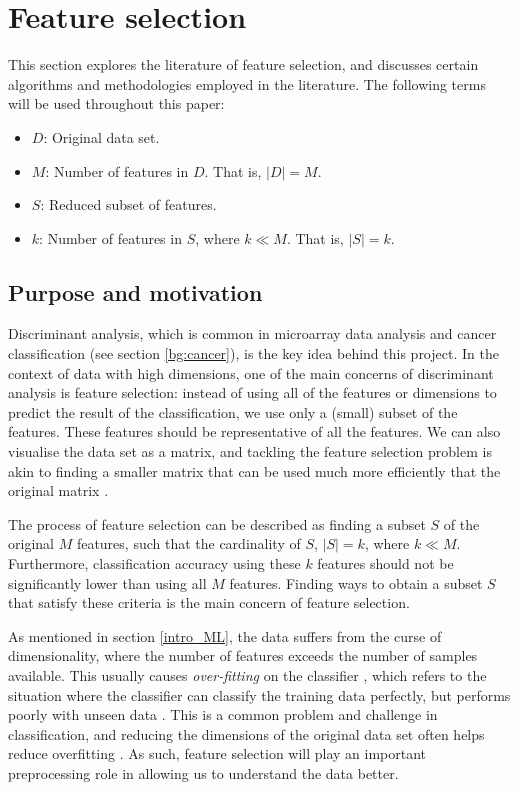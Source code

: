 \documentclass[12pt, twoside, a4paper]{report}
\begin{document}
\section{Feature selection} \label{bg:feature_selection}

This section explores the literature of feature selection, and discusses certain algorithms and methodologies employed in the literature. The following terms will be used throughout this paper:
\begin{itemize}
  \item $D$: Original data set.
  \item $M$: Number of features in $D$. That is, $|D| = M$.
  \item $S$: Reduced subset of features.
  \item $k$: Number of features in $S$, where $k \ll M$. That is, $|S| = k$.
\end{itemize}

\subsection{Purpose and motivation} \label{bg:fs:purpose}

Discriminant analysis, which is common in microarray data analysis and cancer classification (see section \ref{bg:cancer}), is the key idea behind this project. In the context of data with high dimensions, one of the main concerns of discriminant analysis is feature selection: instead of using all of the features or dimensions to predict the result of the classification, we use only a (small) subset of the features. These features should be representative of all the features. We can also visualise the data set as a matrix, and tackling the feature selection problem is akin to finding a smaller matrix that can be used much more efficiently that the original matrix \cite{RefWorks:163}.

The process of feature selection can be described as finding a subset $S$ of the original $M$ features, such that the cardinality of $S$, $|S|=k$, where $k \ll M$. Furthermore, classification accuracy using these $k$ features should not be significantly lower than using all $M$ features. Finding ways to obtain a subset $S$ that satisfy these criteria is the main concern of feature selection.

As mentioned in section \ref{intro_ML}, the data suffers from the curse of dimensionality, where the number of features exceeds the number of samples available. This usually causes \textit{over-fitting} on the classifier \cite{RefWorks:115, RefWorks:175}, which refers to the situation where the classifier can classify the training data perfectly, but performs poorly with unseen data \cite{RefWorks:98}. This is a common problem and challenge in classification, and reducing the dimensions of the original data set often helps reduce overfitting \cite{RefWorks:228}. As such, feature selection will play an important preprocessing role in allowing us to understand the data better.
\end{document}
